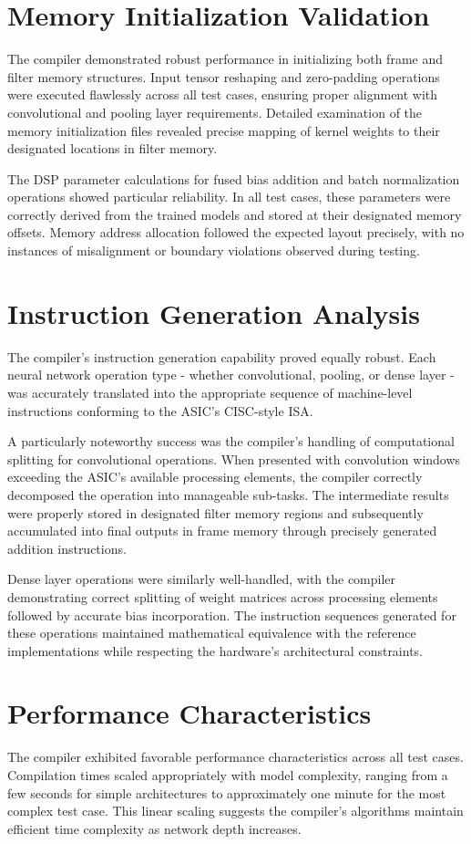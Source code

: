 \documentclass[12pt]{report}
\begin{document}
\section{Memory Initialization Validation}
The compiler demonstrated robust performance in initializing both frame and filter memory structures. Input tensor reshaping and zero-padding operations were executed flawlessly across all test cases, ensuring proper alignment with convolutional and pooling layer requirements. Detailed examination of the memory initialization files revealed precise mapping of kernel weights to their designated locations in filter memory.

The DSP parameter calculations for fused bias addition and batch normalization operations showed particular reliability. In all test cases, these parameters were correctly derived from the trained models and stored at their designated memory offsets. Memory address allocation followed the expected layout precisely, with no instances of misalignment or boundary violations observed during testing.

\section{Instruction Generation Analysis}
The compiler's instruction generation capability proved equally robust. Each neural network operation type - whether convolutional, pooling, or dense layer - was accurately translated into the appropriate sequence of machine-level instructions conforming to the ASIC's CISC-style ISA.

A particularly noteworthy success was the compiler's handling of computational splitting for convolutional operations. When presented with convolution windows exceeding the ASIC's available processing elements, the compiler correctly decomposed the operation into manageable sub-tasks. The intermediate results were properly stored in designated filter memory regions and subsequently accumulated into final outputs in frame memory through precisely generated addition instructions.

Dense layer operations were similarly well-handled, with the compiler demonstrating correct splitting of weight matrices across processing elements followed by accurate bias incorporation. The instruction sequences generated for these operations maintained mathematical equivalence with the reference implementations while respecting the hardware's architectural constraints.

\section{Performance Characteristics}
The compiler exhibited favorable performance characteristics across all test cases. Compilation times scaled appropriately with model complexity, ranging from a few seconds for simple architectures to approximately one minute for the most complex test case. This linear scaling suggests the compiler's algorithms maintain efficient time complexity as network depth increases.
\end{document}
